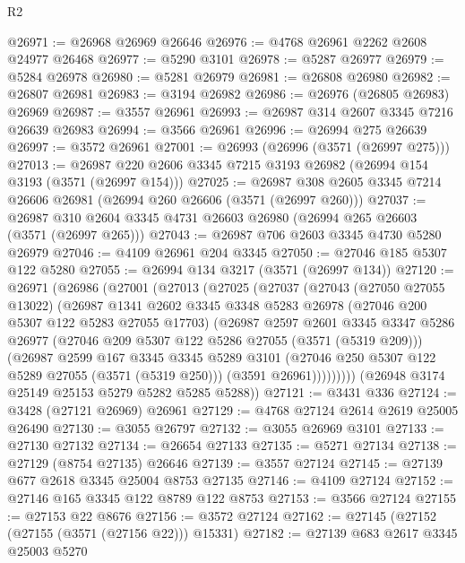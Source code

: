 \begin{lexlean}{R2}
\begin{coremodule}
@26971 := @26968 @26969 @26646
@26976 := @4768 @26961 @2262 @2608 @24977 @26468
@26977 := @5290 @3101
@26978 := @5287 @26977
@26979 := @5284 @26978
@26980 := @5281 @26979
@26981 := @26808 @26980
@26982 := @26807 @26981
@26983 := @3194 @26982
@26986 := @26976 (@26805 @26983) @26969
@26987 := @3557 @26961
@26993 := @26987 @314 @2607 @3345 @7216 @26639 @26983
@26994 := @3566 @26961
@26996 := @26994 @275 @26639
@26997 := @3572 @26961
@27001 := @26993 (@26996 (@3571 (@26997 @275)))
@27013 := @26987 @220 @2606 @3345 @7215 @3193 @26982 (@26994 @154 @3193 (@3571 (@26997 @154)))
@27025 := @26987 @308 @2605 @3345 @7214 @26606 @26981 (@26994 @260 @26606 (@3571 (@26997 @260)))
@27037 := @26987 @310 @2604 @3345 @4731 @26603 @26980 (@26994 @265 @26603 (@3571 (@26997 @265)))
@27043 := @26987 @706 @2603 @3345 @4730 @5280 @26979
@27046 := @4109 @26961 @204 @3345
@27050 := @27046 @185 @5307 @122 @5280
@27055 := @26994 @134 @3217 (@3571 (@26997 @134))
@27120 := @26971
    (@26986
      (@27001
        (@27013
          (@27025
            (@27037
              (@27043
                (@27050 @27055 @13022)
                (@26987
                  @1341
                  @2602
                  @3345
                  @3348
                  @5283
                  @26978
                  (@27046 @200 @5307 @122 @5283 @27055 @17703)
                  (@26987
                    @2597
                    @2601
                    @3345
                    @3347
                    @5286
                    @26977
                    (@27046 @209 @5307 @122 @5286 @27055 (@3571 (@5319 @209)))
                    (@26987
                      @2599
                      @167
                      @3345
                      @3345
                      @5289
                      @3101
                      (@27046 @250 @5307 @122 @5289 @27055 (@3571 (@5319 @250)))
                      (@3591 @26961)))))))))
      (@26948 @3174 @25149 @25153 @5279 @5282 @5285 @5288))
@27121 := @3431 @336
@27124 := @3428 (@27121 @26969) @26961
@27129 := @4768 @27124 @2614 @2619 @25005 @26490
@27130 := @3055 @26797
@27132 := @3055 @26969 @3101
@27133 := @27130 @27132
@27134 := @26654 @27133
@27135 := @5271 @27134
@27138 := @27129 (@8754 @27135) @26646
@27139 := @3557 @27124
@27145 := @27139 @677 @2618 @3345 @25004 @8753 @27135
@27146 := @4109 @27124
@27152 := @27146 @165 @3345 @122 @8789 @122 @8753
@27153 := @3566 @27124
@27155 := @27153 @22 @8676
@27156 := @3572 @27124
@27162 := @27145 (@27152 (@27155 (@3571 (@27156 @22))) @15331)
@27182 := @27139
    @683
    @2617
    @3345
    @25003
    @5270

\end{coremodule}
\end{lexlean}
